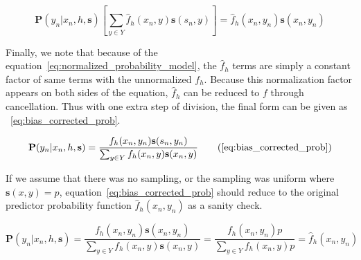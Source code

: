 \documentclass[twoside]{article}
\begin{document}
\begin{appendices}
\[\mathbf{P}(y_n|x_n,h,\mathbf{s})\left [\sum_{y \in Y}\hat{f}_h(x_n,y)\mathbf{s}(s_n,y) \right ]=\hat{f}_h(x_n,y_n)\mathbf{s}(x_n,y_n) \]

Finally, we note that because of the equation~\eqref{eq:normalized_probability_model}, the \(\hat{f}_h\) terms are simply a constant factor of same terms with the unnormalized \(f_h\). Because this normalization factor appears on both sides of the equation, \(\hat{f}_h\) can be reduced to \(f\) through cancellation. Thus with one extra step of division, the final form can be given as ~\eqref{eq:bias_corrected_prob}.

\begin{equation}
\mathbf{P}(y_n|x_n,h,\mathbf{s})=\dfrac{f_h(x_n,y_n)\mathbf{s}(s_n,y_n)}{\sum_{y \in Y}f_h(x_n,y)\mathbf{s}(x_n,y)}
\tag{\ref{eq:bias_corrected_prob}}
\end{equation}

If we assume that there was no sampling, or the sampling was uniform where \(\mathbf{s}(x,y)=p\), equation~\eqref{eq:bias_corrected_prob} should reduce to the original predictor probability function \(\hat{f}_h(x_n,y_n)\) as a sanity check.

\[\mathbf{P}(y_n|x_n,h,\mathbf{s})=\frac{f_h(x_n,y_n)\mathbf{s}(x_n,y_n)}{\sum_{y \in Y}f_h(x_n,y)\mathbf{s}(x_n,y)}=\frac{f_h(x_n,y_n)p}{\sum_{y \in Y}f_h(x_n,y)p} =\hat{f}_h(x_n,y_n)\]

\end{appendices}

\end{document}
